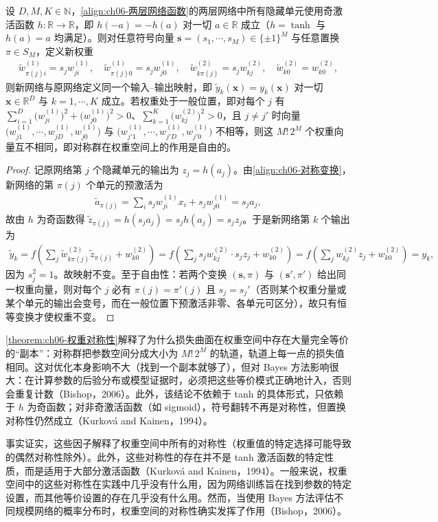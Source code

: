 \documentclass[../../main.tex]{subfiles}
\begin{document}
\begin{theorem}[权重空间的对称性]\label{theorem:ch06-权重对称性}
设 $D,M,K\in\mathbb{N}$，\eqref{align:ch06-两层网络函数}的两层网络中所有隐藏单元使用奇激活函数 $h:\mathbb{R}\to\mathbb{R}$，即 $h(-a)=-h(a)$ 对一切 $a\in\mathbb{R}$ 成立（$h=\tanh$ 与 $h(a)=a$ 均满足）。则对任意符号向量 $\boldsymbol{s}=(s_1,\cdots,s_M)\in\{\pm1\}^{M}$ 与任意置换 $\pi\in S_M$，定义新权重
\begin{align}
\tilde w_{\pi(j)i}^{(1)}=s_jw_{ji}^{(1)},\quad
\tilde w_{\pi(j)0}^{(1)}=s_jw_{j0}^{(1)},\quad
\tilde w_{k\pi(j)}^{(2)}=s_jw_{kj}^{(2)},\quad
\tilde w_{k0}^{(2)}=w_{k0}^{(2)},
\label{align:ch06-对称变换}
\end{align}
则新网络与原网络定义同一个输入--输出映射，即 $\tilde y_k(\boldsymbol{x})=y_k(\boldsymbol{x})$ 对一切 $\boldsymbol{x}\in\mathbb{R}^{D}$ 与 $k=1,\cdots,K$ 成立。若权重处于一般位置，即对每个 $j$ 有 $\sum_{i=1}^{D}\bigl(w_{ji}^{(1)}\bigr)^{2}+\bigl(w_{j0}^{(1)}\bigr)^{2}>0$、$\sum_{k=1}^{K}\bigl(w_{kj}^{(2)}\bigr)^{2}>0$，且 $j\neq j'$ 时向量 $\bigl(w_{j1}^{(1)},\cdots,w_{jD}^{(1)},w_{j0}^{(1)}\bigr)$ 与 $\bigl(w_{j'1}^{(1)},\cdots,w_{j'D}^{(1)},w_{j'0}^{(1)}\bigr)$ 不相等，则这 $M!\,2^{M}$ 个权重向量互不相同，即对称群在权重空间上的作用是自由的。
\end{theorem}

\begin{proof}
记原网络第 $j$ 个隐藏单元的输出为 $z_j=h(a_j)$。由\eqref{align:ch06-对称变换}，新网络的第 $\pi(j)$ 个单元的预激活为
\begin{align}
\tilde a_{\pi(j)}=\sum_{i}s_jw_{ji}^{(1)}x_i+s_jw_{j0}^{(1)}=s_ja_j,
\end{align}
故由 $h$ 为奇函数得 $\tilde z_{\pi(j)}=h(s_ja_j)=s_jh(a_j)=s_jz_j$。于是新网络第 $k$ 个输出为
\begin{align}
\tilde y_k=f\!\left(\sum_{j}\tilde w_{k\pi(j)}^{(2)}\tilde z_{\pi(j)}+w_{k0}^{(2)}\right)
=f\!\left(\sum_{j}s_jw_{kj}^{(2)}\cdot s_jz_j+w_{k0}^{(2)}\right)
=f\!\left(\sum_{j}w_{kj}^{(2)}z_j+w_{k0}^{(2)}\right)=y_k,
\end{align}
因为 $s_j^{2}=1$。故映射不变。至于自由性：若两个变换 $(\boldsymbol{s},\pi)$ 与 $(\boldsymbol{s}',\pi')$ 给出同一权重向量，则对每个 $j$ 必有 $\pi(j)=\pi'(j)$ 且 $s_j=s_j'$（否则某个权重分量或某个单元的输出会变号，而在一般位置下预激活非零、各单元可区分），故只有恒等变换才使权重不变。
\end{proof}

\begin{remark}\cref{theorem:ch06-权重对称性}解释了为什么损失曲面在权重空间中存在大量完全等价的“副本”：对称群把参数空间分成大小为 $M!\,2^{M}$ 的轨道，轨道上每一点的损失值相同。这对优化本身影响不大（找到一个副本就够了），但对 Bayes 方法影响很大：在计算参数的后验分布或模型证据时，必须把这些等价模式正确地计入，否则会重复计数（Bishop，2006）。此外，该结论不依赖于 tanh 的具体形式，只依赖于 $h$ 为奇函数；对非奇激活函数（如 sigmoid），符号翻转不再是对称性，但置换对称性仍然成立（Kurková and Kainen，1994）。
\end{remark}

事实证实，这些因子解释了权重空间中所有的对称性（权重值的特定选择可能导致的偶然对称性除外）。此外，这些对称性的存在并不是 tanh 激活函数的特定性质，而是适用于大部分激活函数（Kurková and Kainen，1994）。一般来说，权重空间中的这些对称性在实践中几乎没有什么用，因为网络训练旨在找到参数的特定设置，而其他等价设置的存在几乎没有什么用。然而，当使用 Bayes 方法评估不同规模网络的概率分布时，权重空间的对称性确实发挥了作用（Bishop，2006）。
\end{document}
